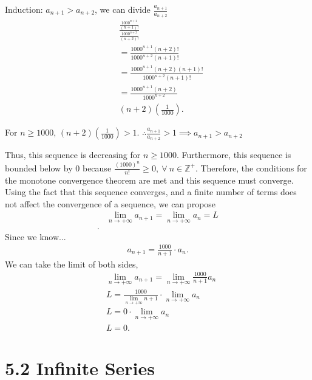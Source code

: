 \documentclass{report}
\begin{document}
{        Induction: $a_{n+1} > a_{n+2}$, we can divide $\frac{a_{n+1}}{a_{n+2}}$ 
        \begin{align*}
            &\frac{\frac{1000^{n+1}}{(n+1)!}}{\frac{1000^{n+2}}{(n+2)!}}    \\
            &= \frac{1000^{n+1}(n+2)!}{1000^{n+2}(n+1)!} \\
            &=\frac{1000^{n+1}(n+2)(n+1)!}{1000^{n+2}(n+1)!} \\
            &=\frac{1000^{n+1}(n+2)}{1000^{n+2}} \\
            &(n+2)\left(\frac{1}{1000}\right)
        .\end{align*}


        For $n \geq 1000$, $(n+2)\left(\frac{1}{1000}\right)  > 1$. $\therefore \frac{a_{n+1}}{a_{n+2}} > 1 \implies a_{n+1} > a_{n+2}$
        \bigbreak \noindent 
        \blacksquare
    }
    \bigbreak \noindent 
    Thus, this sequence is decreasing for $n \geq 1000$. Furthermore, this sequence is bounded below by $0$ because $\frac{(1000)^{n}}{n!} \geq 0,\  \forall\ n \in \mathbb{Z^{+}}$. Therefore, the conditions for the monotone convergence theorem are met and this sequence must converge.
    \bigbreak \noindent 
    Using the fact that this sequence converges, and a finite number of terms does not affect the convergence of a sequence, we can propose
    \begin{align*}
        &\lim\limits_{n \to +\infty}{a_{n+1}} = \lim\limits_{n \to +\infty}{a_{n}} = L  \\
    .\end{align*}
    \bigbreak \noindent 
    Since we know...
    \begin{align*}
        a_{n+1} = \frac{1000}{n+1}\cdot a_{n} 
    .\end{align*}
    We can take the limit of both sides, 
    \begin{align*}
        &\lim\limits_{n \to +\infty}{a_{n+1}} = \lim\limits_{n \to +\infty}{\frac{1000}{n+1}a_{n}} \\
        &L = \frac{1000}{\lim\limits_{n \to +\infty}{n+1}}\cdot \lim\limits_{n \to +\infty}{a_{n}} \\
        &L = 0 \cdot \lim\limits_{n \to +\infty}{a_{n}} \\
        &L = 0
    .\end{align*}

    \pagebreak 
    \section*{5.2 Infinite Series}
    \bigbreak \noindent 
\end{document}
